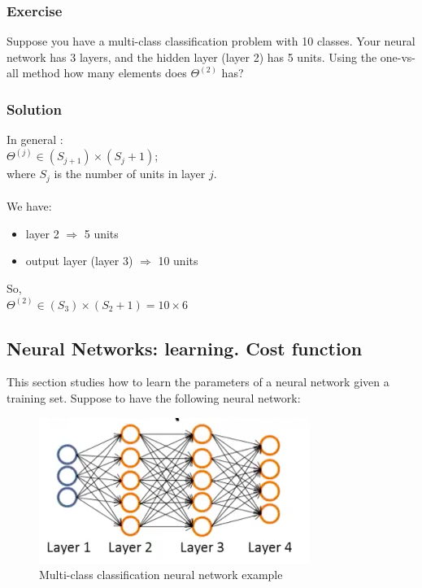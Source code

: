 \newpage
\begin{mdframed}[style=MyFrame]
\subsubsection{Exercise}
Suppose you have a multi-class classification problem with 10 classes. Your neural network has 3 layers, and the hidden layer (layer 2) has 5 units. Using the one-vs-all method how many elements does $\Theta^{(2)}$ has?\\


\subsubsection{Solution}
In general :\\
$\Theta^{(j)} \in (S_{j+1}) \times (S_j +1)$;\\
where $S_j$ is the number of units in layer $j$.\\
\\
We have:
\begin{itemize}
	\item layer 2 $\Rightarrow$ 5 units
	\item output layer (layer 3) $\Rightarrow$ 10 units
\end{itemize}
So, \\
$\Theta^{(2)} \in (S_{3}) \times (S_2 +1) = 10 \times 6$ 
\end{mdframed}

\subsection{Neural Networks: learning. Cost function}
This section studies how to learn the parameters of a neural network given a training set. Suppose to have the following neural network:

\begin{figure}[H]
\begin{center}
\includegraphics[scale=0.35]{images/learn-nn}
\end{center}
\caption{Multi-class classification neural network example } 
\label{fig:learn-nn}
\end{figure}
 
